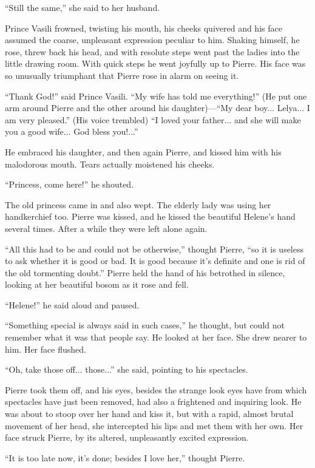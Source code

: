 ``Still the same,'' she said to her husband.

Prince Vasili frowned, twisting his mouth, his cheeks quivered
and his face assumed the coarse, unpleasant expression peculiar
to him. Shaking himself, he rose, threw back his head, and with
resolute steps went past the ladies into the little drawing
room. With quick steps he went joyfully up to Pierre. His face
was so unusually triumphant that Pierre rose in alarm on seeing
it.

``Thank God!'' said Prince Vasili. ``My wife has told me
everything!'' (He put one arm around Pierre and the other around
his daughter)---``My dear boy... Lelya... I am very pleased.''
(His voice trembled) ``I loved your father... and she will make
you a good wife... God bless you!...''

He embraced his daughter, and then again Pierre, and kissed him
with his malodorous mouth. Tears actually moistened his cheeks.

``Princess, come here!'' he shouted.

The old princess came in and also wept. The elderly lady was
using her handkerchief too. Pierre was kissed, and he kissed the
beautiful Helene's hand several times. After a while they were
left alone again.

``All this had to be and could not be otherwise,'' thought
Pierre, ``so it is useless to ask whether it is good or bad. It
is good because it's definite and one is rid of the old
tormenting doubt.'' Pierre held the hand of his betrothed in
silence, looking at her beautiful bosom as it rose and fell.

``Helene!'' he said aloud and paused.

``Something special is always said in such cases,'' he thought,
but could not remember what it was that people say. He looked at
her face. She drew nearer to him. Her face flushed.

``Oh, take those off... those...'' she said, pointing to his
spectacles.

Pierre took them off, and his eyes, besides the strange look eyes
have from which spectacles have just been removed, had also a
frightened and inquiring look. He was about to stoop over her
hand and kiss it, but with a rapid, almost brutal movement of her
head, she intercepted his lips and met them with her own. Her
face struck Pierre, by its altered, unpleasantly excited
expression.

``It is too late now, it's done; besides I love her,'' thought
Pierre.

